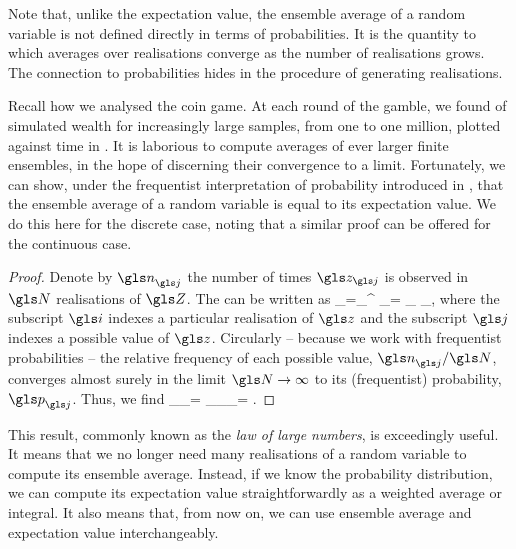 Note that, unlike the expectation value, the ensemble average of a random variable is not defined directly 
in terms of probabilities. It is the quantity to which averages over realisations converge as the number of 
realisations grows. The connection to probabilities hides in the procedure of generating realisations. 

Recall how we analysed the coin game. At each round of the gamble, we found \FEAs of 
simulated wealth for increasingly large samples, from one to one million, plotted against time in .
It is laborious to compute averages of ever larger finite ensembles, in the hope of discerning their 
convergence to a limit. Fortunately, we can show, under the frequentist interpretation of probability 
introduced in , that the ensemble average of a random variable is equal 
to its expectation value. We do this here for the discrete case, noting that a similar proof can be 
offered for the continuous case.
\begin{proof}
Denote by  $\gn_\gj$ the number of times $\z_\gj$ is observed in $\N$ realisations of $\Z$. The \FEA can be written as
\be
\ave{\Z}_\N =\sum_{}^{\N}  \z_\gi = \sum_\gj \frac{\gn_\gj}{\N} \z_\gj,
\ee
where the subscript $\gi$ indexes a particular realisation of $\z$ and the subscript $\gj$ indexes a possible value of $\z$. 
Circularly -- because we work with frequentist probabilities -- the relative frequency of each possible value, 
$\gn_\gj/\N$, converges almost surely in the limit $\N\to\infty$ to its (frequentist) probability, $\p_\gj$. Thus, we find
\be
\lim_{\N\to\infty}\ave{\Z}_\N = \sum_\gj \p_\gj \z_\gj = \eval{\Z}.
\ee
\end{proof}
This result, commonly known as the \textit{law of large numbers}, is exceedingly useful. It means that we no longer need many realisations of a random variable to compute its ensemble average. Instead, if we know the probability distribution, we can compute its expectation value straightforwardly as a weighted average or integral. It also means that, from now on, we can use ensemble average and expectation value interchangeably.

